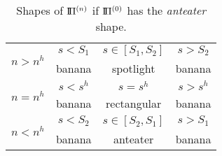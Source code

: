 %
\begin{table}
\centering
\begin{tabular}{c|ccc}
\multirow{2}{*}{$n > n^h$} & $s < S_1$ & $s \in [S_1, S_2]$ & $s > S_2$ \\
                           & banana    & spotlight          & banana \\
\hline
\multirow{2}{*}{$n = n^h$} & $s < s^h$ & $s = s^h$          & $s > s^h$ \\
                           & banana    &  rectangular       &  banana \\
\hline
\multirow{2}{*}{$n < n^h$} & $s < S_2$ & $s \in [S_2, S_1]$ & $s > S_1$ \\
                           & banana    & anteater           &  banana
\end{tabular}
\caption{Shapes of $\text{I}\!\Pi^{(n)}$ if $\text{I}\!\Pi^{(0)}$ has the \emph{anteater} shape.}
\label{tab:anteater-shapes}
\end{table}


